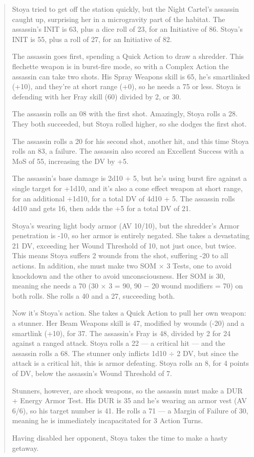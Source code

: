 \begin{quotation}
Stoya tried to get off the station quickly, but the Night Cartel’s assassin caught up, surprising her in a microgravity part of the habitat. The assassin’s INIT is 63, plus a dice roll of 23, for an Initiative of 86. Stoya’s INIT is 55, plus a roll of 27, for an Initiative of 82.

The assassin goes first, spending a Quick Action to draw a shredder. This flechette weapon is in burst-fire mode, so with a Complex Action the assassin can take two shots. His Spray Weapons skill is 65, he’s smartlinked (+10), and they’re at short range (+0), so he needs a 75 or less. Stoya is defending with her Fray skill (60) divided by 2, or 30.

The assassin rolls an 08 with the first shot. Amazingly, Stoya rolls a 28. They both succeeded, but Stoya rolled higher, so she dodges the first shot.

The assassin rolls a 20 for his second shot, another hit, and this time Stoya rolls an 83, a failure. The assassin also scored an Excellent Success with a MoS of 55, increasing the DV by +5.

The assassin’s base damage is 2d10 + 5, but he’s using burst fire against a single target for +1d10, and it’s also a cone effect weapon at short range, for an additional +1d10, for a total DV of 4d10 + 5. The assassin rolls 4d10 and gets 16, then adds the +5 for a total DV of 21.

Stoya’s wearing light body armor (AV 10/10), but the shredder’s Armor penetration is -10, so her armor is entirely negated. She takes a devastating 21 DV, exceeding her Wound Threshold of 10, not just once, but twice. This means Stoya suffers 2 wounds from the shot, suffering -20 to all actions. In addition, she must make two SOM $\times$ 3 Tests, one to avoid knockdown and the other to avoid unconsciousness. Her SOM is 30, meaning she needs a 70 (30 $\times$ 3 = 90, 90 $-$ 20 wound modifiers = 70) on both rolls. She rolls a 40 and a 27, succeeding both.

Now it’s Stoya’s action. She takes a Quick Action to pull her own weapon: a stunner. Her Beam Weapons skill is 47, modified by wounds (-20) and a smartlink (+10), for 37. The assassin’s Fray is 48, divided by 2 for 24 against a ranged attack. Stoya rolls a 22 --- a critical hit --- and the assassin rolls a 68. The stunner only inflicts 1d10 $\div$ 2 DV, but since the attack is a critical hit, this is armor defeating. Stoya rolls an 8, for 4 points of DV, below the assassin’s Wound Threshold of 7.

Stunners, however, are shock weapons, so the assassin must make a DUR + Energy Armor Test. His DUR is 35 and he’s wearing an armor vest (AV 6/6), so his target number is 41. He rolls a 71 --- a Margin of Failure of 30, meaning he is immediately incapacitated for 3 Action Turns.

Having disabled her opponent, Stoya takes the time to make a hasty getaway.
\end{quotation}


